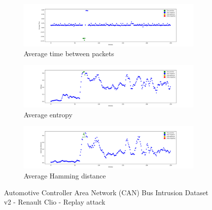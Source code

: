 \begin{figure}
    \centering
    \begin{subfigure}[b]{\linewidth}
        \includegraphics[width = \linewidth]{img/parts/app/tests/tue/RenaultClio/replay/AvgTime.png}
        \caption{Average time between packets}
        \label{subfig:extract_tue_renaultclio_replay_avgtime}
    \end{subfigure}
    \begin{subfigure}[b]{\linewidth}
        \includegraphics[width = \linewidth]{img/parts/app/tests/tue/RenaultClio/replay/Entropy.png}
        \caption{Average entropy}
        \label{subfig:extract_tue_renaultclio_replay_entropy}
    \end{subfigure}
    \begin{subfigure}[b]{\linewidth}
        \includegraphics[width = \linewidth]{img/parts/app/tests/tue/RenaultClio/replay/HammingDist.png}
        \caption{Average Hamming distance}
        \label{subfig:extract_tue_renaultclio_replay_hammingdist}
    \end{subfigure}
    \caption{Automotive Controller Area Network (CAN) Bus Intrusion Dataset v2 - Renault Clio - Replay attack}
    \label{fig:extract_tue_renaultclio_replay}
\end{figure}

